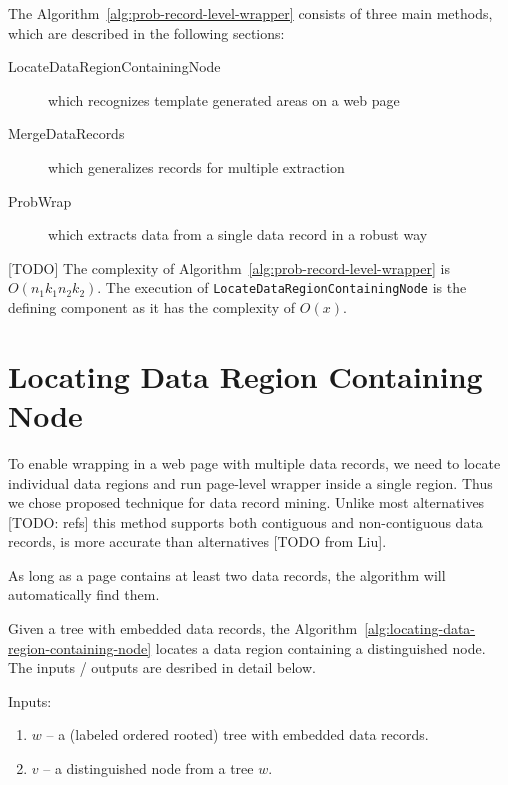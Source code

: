 

The Algorithm~\ref{alg:prob-record-level-wrapper} consists of three main methods, which are described in the following sections:
\begin{description}
	\item[LocateDataRegionContainingNode] which recognizes template generated areas on a web page
	\item[MergeDataRecords] which generalizes records for multiple extraction
	\item[ProbWrap] which extracts data from a single data record in a robust way
\end{description}

[TODO] The complexity of Algorithm~\ref{alg:prob-record-level-wrapper} is $O(n_1 k_1 n_2 k_2)$. The execution of \texttt{LocateDataRegionContainingNode} is the defining component as it has the complexity of $O(x)$.


\section{Locating Data Region Containing Node}

To enable wrapping in a web page with multiple data records, we need to locate individual data regions and run page-level wrapper inside a single region. Thus we chose \cite{liu2009a} proposed technique for data record mining. Unlike most alternatives [TODO: refs] this method supports both contiguous and non-contiguous data records, is more accurate than alternatives [TODO from Liu].

As long as a page contains at least two data records, the algorithm will automatically find them.

Given a tree with embedded data records, the Algorithm~\ref{alg:locating-data-region-containing-node} locates a data region containing a distinguished node. The inputs / outputs are desribed in detail below.

Inputs: 

\begin{enumerate}
	\item $w$ -- a (labeled ordered rooted) tree with embedded data records.
	\item $v$ -- a distinguished node from a tree $w$.
\end{enumerate}

